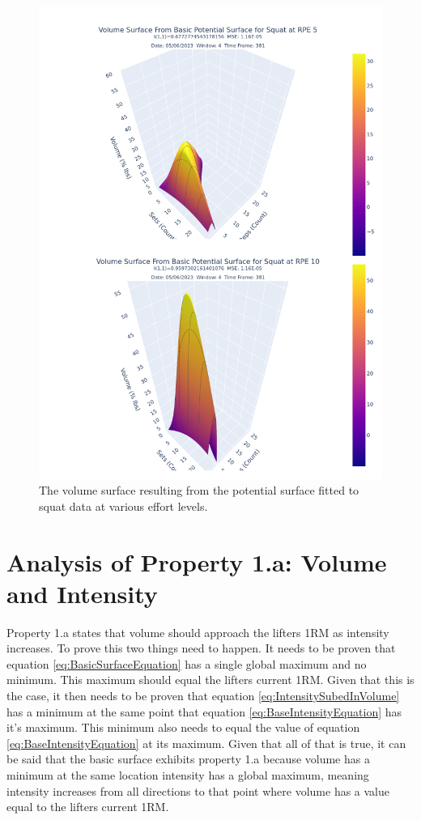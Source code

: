 \begin{figure}[htbp]
    \centering
    \includegraphics[scale=0.55]{images/ch3/Volume/DualSquat.Effort[5,10].basic.png}
    \caption{The volume surface resulting from the potential surface fitted to squat data at various effort levels.}
    \label{fig:SquatPotentialSurfaceVolumeAcrossEffort}
\end{figure}

\section{Analysis of Property 1.a: Volume and Intensity}
\label{sec:PotentialSurfaceAnalysisOfProperty1a}

Property 1.a states that volume should approach the lifters 1RM as intensity increases. To prove this two things need to happen. It needs to be proven that equation \ref{eq:BasicSurfaceEquation} has a single global maximum and no minimum. This maximum should equal the lifters current 1RM. Given that this is the case, it then needs to be proven that equation \ref{eq:IntensitySubedInVolume} has a  minimum at the same point that equation \ref{eq:BaseIntensityEquation} has it's maximum. This minimum also needs to equal the value of equation \ref{eq:BaseIntensityEquation} at its maximum. Given that all of that is true, it can be said that the basic surface exhibits property 1.a because volume has a minimum at the same location intensity has a global maximum, meaning intensity increases from all directions to that point where volume has a value equal to the lifters current 1RM.

